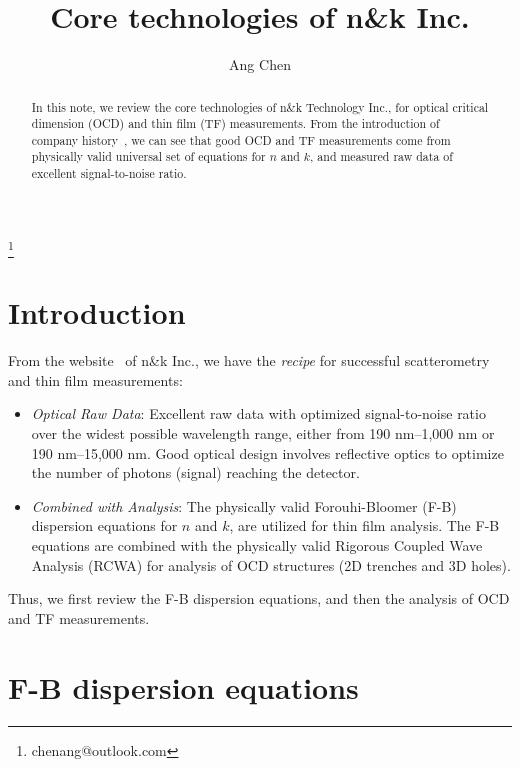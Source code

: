 \documentclass[pra,superscriptaddress,reprint]{revtex4-1}
\begin{document}
\title{\Large Core technologies of n\&k Inc.}

\author{Ang Chen}
\thanks{chenang@outlook.com}


\begin{abstract}
In this note, we review the core technologies of n\&k Technology Inc., 
for optical critical dimension (OCD) and thin film (TF) measurements.
From the introduction of company history~\cite{nkhistory}, we can see that good OCD and TF measurements come from
physically valid universal set of equations for $n$ and $k$, and measured raw data of excellent signal-to-noise ratio.
\end{abstract}

\maketitle


\section{Introduction~\label{sec:1}}
From the website~\cite{nkpremise} of n\&k Inc., we have the \textit{recipe} for successful 
scatterometry and thin film measurements:
\begin{itemize}%
\setlength{\itemsep}{2pt}
\setlength{\parsep}{0pt}
\setlength{\parskip}{0pt}
\item \textit{Optical Raw Data}: Excellent raw data with optimized signal-to-noise ratio over the widest possible wavelength range, 
either from 190 nm--1,000 nm or 190 nm--15,000 nm. Good optical design involves reflective optics to optimize the number of photons (signal) reaching the detector.
\item \textit{Combined with Analysis}: The physically valid Forouhi-Bloomer (F-B) dispersion equations for $n$ and $k$, are utilized for thin film analysis.
The F-B equations are combined with the physically valid Rigorous Coupled Wave Analysis (RCWA) for analysis of OCD structures (2D trenches and 3D holes).
\end{itemize}

Thus, we first review the F-B dispersion equations, and then the analysis of OCD and TF measurements.  

\section{F-B dispersion equations}
\end{document}
